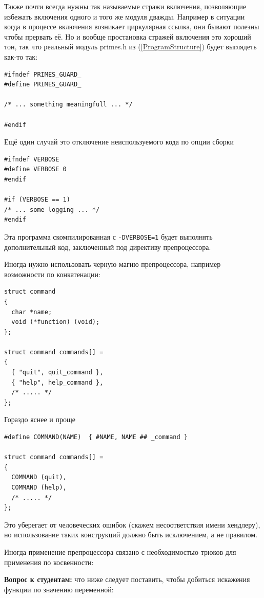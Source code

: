 \documentclass[a4paper,12pt,oneside]{article}
\begin{document}
Также почти всегда нужны так называемые стражи включения, позволяющие избежать включения одного и того же модуля дважды. Например в ситуации когда в процессе включения возникает циркулярная ссылка, они бывают полезны чтобы прервать её. Но и вообще простановка стражей включения это хороший тон, так что реальный модуль primes.h из (\ref{ProgramStructure}) будет выглядеть как-то так:

\begin{lstlisting}
#ifndef PRIMES_GUARD_
#define PRIMES_GUARD_

/* ... something meaningfull ... */

#endif
\end{lstlisting}

Ещё один случай это отключение неиспользуемого кода по опции сборки

\begin{lstlisting}
#ifndef VERBOSE
#define VERBOSE 0
#endif

#if (VERBOSE == 1)
/* ... some logging ... */
#endif
\end{lstlisting}

Эта программа скомпилированная с \lstinline!-DVERBOSE=1! будет выполнять дополнительный код, заключенный под директиву препроцессора.

Иногда нужно использовать черную магию препроцессора, например возможности по конкатенации:

\begin{lstlisting}
struct command
{
  char *name;
  void (*function) (void);
};
     
struct command commands[] =
{
  { "quit", quit_command },
  { "help", help_command },
  /* ..... */
};
\end{lstlisting}

Гораздо яснее и проще

\begin{lstlisting}
#define COMMAND(NAME)  { #NAME, NAME ## _command }
     
struct command commands[] =
{
  COMMAND (quit),
  COMMAND (help),
  /* ..... */
};
\end{lstlisting}

Это уберегает от человеческих ошибок (скажем несоответствия имени хендлеру), но использование таких конструкций должно быть исключением, а не правилом.

Иногда применение препроцессора связано с необходимостью трюков для применения по косвенности:

\textbf{Вопрос к студентам:} что ниже следует поставить, чтобы добиться искажения функции по значению переменной:
\end{document}

